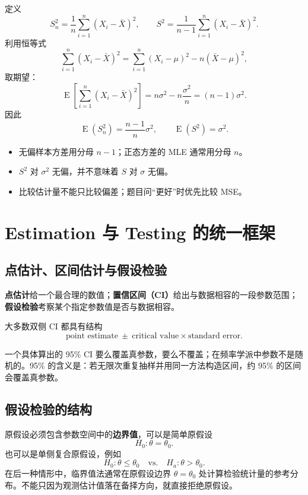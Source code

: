 \documentclass[11pt,a4paper]{article}
\newcommand{\E}{\operatorname{E}}
\newcommand{\1}{\mathbf{1}}
\begin{document}
定义
\[
  S_n^2=\frac{1}{n}\sum_{i=1}^n(X_i-\bar X)^2,
  \qquad
  S^2=\frac{1}{n-1}\sum_{i=1}^n(X_i-\bar X)^2.
\]
利用恒等式
\[
  \sum_{i=1}^n(X_i-\bar X)^2
  =
  \sum_{i=1}^n(X_i-\mu)^2-n(\bar X-\mu)^2,
\]
取期望：
\[
  \E\left[\sum_{i=1}^n(X_i-\bar X)^2\right]
  =
  n\sigma^2-n\frac{\sigma^2}{n}
  =
  (n-1)\sigma^2.
\]
因此
\[
  \boxed{\E(S_n^2)=\frac{n-1}{n}\sigma^2,\qquad \E(S^2)=\sigma^2.}
\]

\begin{warnbox}[常见陷阱]
\begin{itemize}
  \item 无偏样本方差用分母 $n-1$；正态方差的 MLE 通常用分母 $n$。
  \item $S^2$ 对 $\sigma^2$ 无偏，并不意味着 $S$ 对 $\sigma$ 无偏。
  \item 比较估计量不能只比较偏差；题目问“更好”时优先比较 MSE。
\end{itemize}
\end{warnbox}

\section{Estimation 与 Testing 的统一框架}

\subsection{点估计、区间估计与假设检验}

\textbf{点估计}给一个最合理的数值；\textbf{置信区间（CI）}给出与数据相容的一段参数范围；\textbf{假设检验}考察某个指定参数值是否与数据相容。

大多数双侧 CI 都具有结构
\[
  \boxed{
  \text{point estimate}
  \ \pm\
  \text{critical value}\times \text{standard error}.
  }
\]

\begin{conceptbox}[置信水平的正确解释]
一个具体算出的 95\% CI 要么覆盖真参数，要么不覆盖；在频率学派中参数不是随机的。95\% 的含义是：若无限次重复抽样并用同一方法构造区间，约 95\% 的区间会覆盖真参数。
\end{conceptbox}

\subsection{假设检验的结构}

原假设必须包含参数空间中的\textbf{边界值}，可以是简单原假设
\[
  H_0:\theta=\theta_0.
\]
也可以是单侧复合原假设，例如
\[
  H_0:\theta\leq\theta_0
  \quad\text{vs.}\quad
  H_a:\theta>\theta_0.
\]
在后一种情形中，临界值法通常在原假设边界 $\theta=\theta_0$ 处计算检验统计量的参考分布。不能只因为观测估计值落在备择方向，就直接拒绝原假设。
\end{document}
